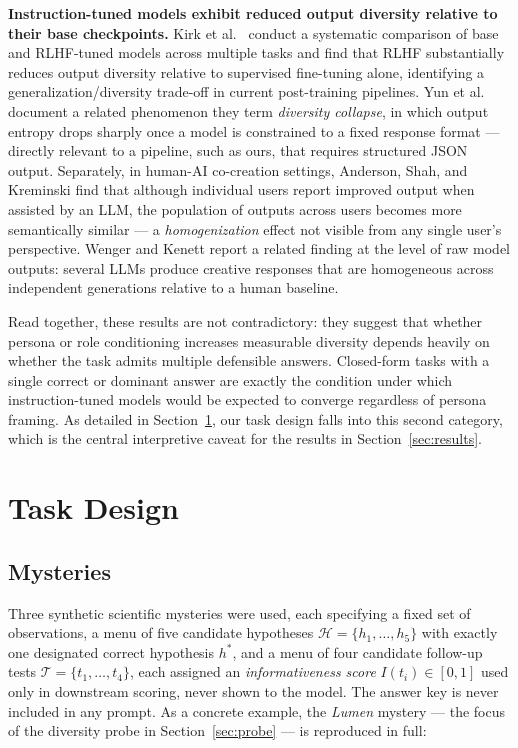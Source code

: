 \documentclass[11pt]{article}
\begin{document}
\textbf{Instruction-tuned models exhibit reduced output diversity relative to their base
checkpoints.} Kirk et al.\ \citep{kirk2023} conduct a systematic comparison of base and RLHF-tuned
models across multiple tasks and find that RLHF substantially reduces output diversity relative to
supervised fine-tuning alone, identifying a generalization/diversity trade-off in current
post-training pipelines. Yun et al.\ \citep{yun2025} document a related phenomenon they term
\emph{diversity collapse}, in which output entropy drops sharply once a model is constrained to a
fixed response format --- directly relevant to a pipeline, such as ours, that requires structured
JSON output. Separately, in human-AI co-creation settings, Anderson, Shah, and Kreminski
\citep{anderson2024} find that although individual users report improved output when assisted by
an LLM, the population of outputs across users becomes more semantically similar --- a
\emph{homogenization} effect not visible from any single user's perspective. Wenger and Kenett
\citep{wenger2026} report a related finding at the level of raw model outputs: several LLMs produce
creative responses that are homogeneous across independent generations relative to a human
baseline.

Read together, these results are not contradictory: they suggest that whether persona or role
conditioning increases measurable diversity depends heavily on whether the task admits multiple
defensible answers. Closed-form tasks with a single correct or dominant answer are exactly the
condition under which instruction-tuned models would be expected to converge regardless of
persona framing. As detailed in Section~\ref{sec:tasks}, our task design falls into this second
category, which is the central interpretive caveat for the results in Section~\ref{sec:results}.

\section{Task Design}
\label{sec:tasks}

\subsection{Mysteries}

Three synthetic scientific mysteries were used, each specifying a fixed set of observations, a
menu of five candidate hypotheses $\mathcal{H} = \{h_1, \ldots, h_5\}$ with exactly one designated
correct hypothesis $h^\ast$, and a menu of four candidate follow-up tests
$\mathcal{T} = \{t_1, \ldots, t_4\}$, each assigned an \emph{informativeness score}
$I(t_i) \in [0,1]$ used only in downstream scoring, never shown to the model. The answer key is
never included in any prompt. As a concrete example, the \emph{Lumen} mystery --- the focus of the
diversity probe in Section~\ref{sec:probe} --- is reproduced in full:
\end{document}
